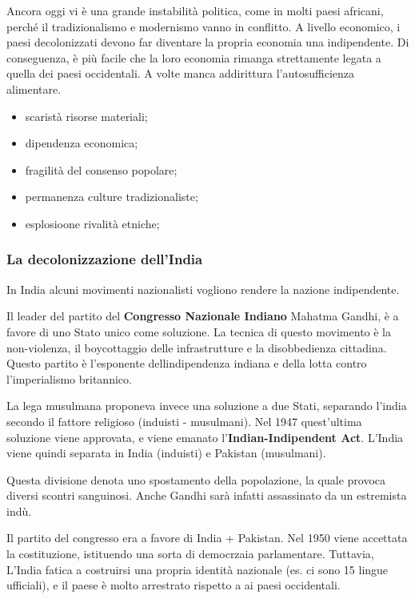 \documentclass[a4paper]{article}
\begin{document}
Ancora oggi vi è una grande instabilità politica, come in molti paesi africani,
perché il tradizionalismo e modernismo vanno in conflitto.
A livello economico, i paesi decolonizzati
devono far diventare la propria economia una indipendente.
Di conseguenza, è più facile che la loro economia rimanga
strettamente legata a quella dei paesi occidentali.
A volte manca addirittura l'autosufficienza alimentare.
\begin{itemize}
    \item scaristà risorse materiali;
    \item dipendenza economica;
    \item fragilità del consenso popolare;
    \item permanenza culture tradizionaliste;
    \item esplosioone rivalità etniche;
\end{itemize}

\subsubsection{La decolonizzazione dell'India}

In India alcuni movimenti nazionalisti vogliono
rendere la nazione indipendente. 

Il leader del partito del \textbf{Congresso Nazionale Indiano} Mahatma Gandhi,
è a favore di uno Stato unico come soluzione.
La tecnica di questo movimento è la non-violenza, il boycottaggio
delle infrastrutture e la disobbedienza cittadina.
Questo partito è l'esponente dellindipendenza indiana e della lotta contro l'imperialismo britannico.

La lega musulmana proponeva invece una soluzione a due Stati,
separando l'india secondo il fattore religioso (induisti - musulmani).
Nel 1947 quest'ultima soluzione viene approvata, e viene emanato
l'\textbf{Indian-Indipendent Act}. 
L'India viene quindi separata in India (induisti) e Pakistan (musulmani).

Questa divisione denota uno spostamento della popolazione,
la quale provoca diversi scontri sanguinosi.
Anche Gandhi sarà infatti assassinato da un estremista indù.


Il partito del congresso era a favore di India + Pakistan. 
Nel 1950 viene accettata la costituzione, istituendo una sorta di democrzaia parlamentare.
Tuttavia, L'India fatica a costruirsi una propria identità nazionale (es. ci sono 15 lingue ufficiali),
e il paese è molto arrestrato rispetto a ai paesi occidentali.
\end{document}
